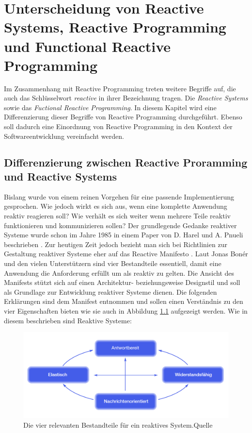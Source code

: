 \chapter{Unterscheidung von Reactive Systems, Reactive Programming und Functional Reactive Programming}\label{abgrenzung}
Im Zusammenhang mit Reactive Programming treten weitere Begriffe auf, die auch das Schlüsselwort \textit{reactive} in ihrer Bezeichnung tragen. Die \textit{Reactive Systems} sowie das \textit{Fuctional Reactive Programming}. In diesem Kapitel wird eine Differenzierung dieser Begriffe von Reactive Programming durchgeführt. Ebenso soll dadurch eine Einordnung von Reactive Programming in den Kontext der Softwareentwicklung vereinfacht werden.
\section{Differenzierung zwischen Reactive Proramming und Reactive Systems}
Bislang wurde von einem reinen Vorgehen für eine passende Implementierung gesprochen. Wie jedoch wirkt es sich aus, wenn eine komplette Anwendung reaktiv reagieren soll? Wie verhält es sich weiter wenn mehrere Teile reaktiv funktionieren und kommunizieren sollen? Der grundlegende Gedanke reaktiver Systeme wurde schon im Jahre 1985 in einem Paper von D. Harel und A. Pnueli beschrieben \cite{Harel.1985}. Zur heutigen Zeit jedoch bezieht man sich bei Richtlinien zur Gestaltung reaktiver Systeme eher auf das Reactive Manifesto \cite{Boner.2014}. Laut Jonas Bonér und den vielen Unterstützern sind vier Bestandteile essentiell, damit eine Anwendung die Anforderung erfüllt um als reaktiv zu gelten. Die Ansicht des Manifests stützt sich auf einen Architektur- beziehungsweise Designstil und soll als Grundlage zur Entwicklung reaktiver Systeme dienen. Die folgenden Erklärungen sind dem Manifest entnommen und sollen einen Verständnis zu den vier Eigenschaften bieten wie sie auch in Abbildung \ref{pic:manifest4} aufgezeigt werden. Wie in diesem beschrieben sind Reaktive Systeme:
\begin{figure}
	\centering
	\includegraphics[width=1\textwidth]{Abb/manifest4achsen.PNG}
	\caption{Die vier relevanten Bestandteile für ein reaktives System.Quelle \cite{Boner.2014}}
	\label{pic:manifest4}
\end{figure}
